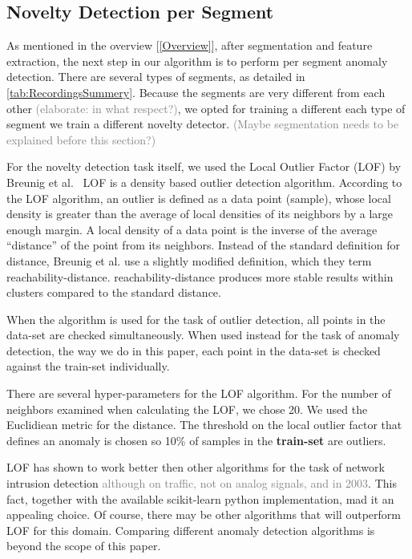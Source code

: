 \documentclass[conference]{IEEEtran}
\begin{document}
\subsection{Novelty Detection per Segment}
  As mentioned in the overview [\ref{Overview}], after segmentation and feature  extraction, the next step in our algorithm is to perform per segment anomaly  detection. There are several types of segments, as detailed in \ref{tab:RecordingsSummery}. Because the segments are very different from each other \textcolor{gray}{(elaborate: in what respect?)}, we opted for training a different each type of segment we train a different novelty detector.
  \textcolor{gray}{(Maybe segmentation needs to be explained before this section?)}
  
  For the novelty detection task itself, we used the Local Outlier Factor (LOF) by Breunig et al.\ \cite{breunig2000lof} LOF is a density based outlier detection algorithm. According to the LOF algorithm, an outlier is defined as a data point (sample), whose local density is greater than the average of local densities of its neighbors by a large enough margin. A local density of a data point is the inverse of the average ``distance'' of the point from its neighbors. Instead of the standard definition for distance, Breunig et al. use a slightly modified definition, which they term reachability-distance. reachability-distance produces more stable results within clusters compared to the standard distance. 
  
  When the algorithm is used for the task of outlier detection, all points in the data-set are checked simultaneously.  When used instead for the task of anomaly detection, the way we do in this paper, each point in the data-set is checked against the train-set individually.
  
  There are several hyper-parameters for the LOF algorithm. For the number of neighbors examined when calculating the LOF, we chose 20. We used the Euclidiean metric for the distance. The threshold on the local outlier factor that defines an anomaly is chosen so 10\% of samples in the \textbf{train-set} are outliers.
  
  LOF has shown to work better then other algorithms for the task of network intrusion detection\cite{lazarevic2003comparative} \textcolor{gray}{although on traffic, not on analog signals, and in 2003}. This fact, together with the available scikit-learn python implementation, mad it an appealing choice. Of course, there may be other algorithms that will outperform LOF for this domain. Comparing different anomaly detection algorithms is beyond the scope of this paper.
  
\end{document}
